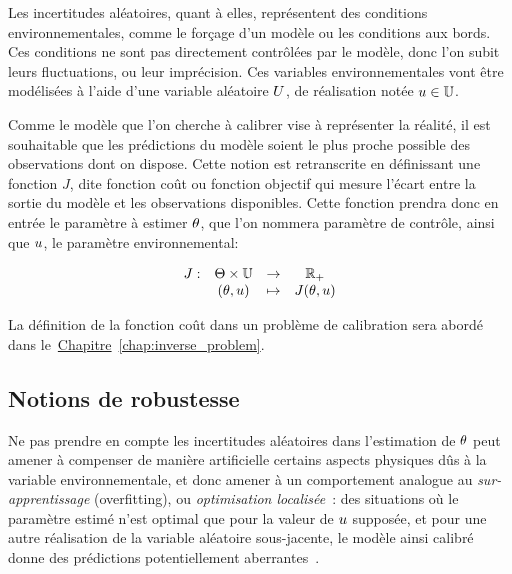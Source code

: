 \documentclass[../../Main_ManuscritThese.tex]{subfiles}
\newcommand{\frchap}[1]{\hyperref[#1]{Chapitre}~\ref{#1}}
\begin{document}
Les incertitudes aléatoires, quant à elles, représentent des
conditions environnementales, comme le forçage d'un modèle ou les
conditions aux bords. Ces conditions ne sont pas directement
contrôlées par le modèle, donc l'on subit leurs fluctuations, ou leur
imprécision. Ces variables environnementales vont être modélisées à
l'aide d'une variable aléatoire $U$, de réalisation notée
$u\in \mathbb{U}$.

Comme le modèle que l'on cherche à calibrer vise à représenter la
réalité, il est souhaitable que les prédictions du modèle soient le
plus proche possible des observations dont on dispose. Cette notion
est retranscrite en définissant une fonction $J$, dite fonction coût
ou fonction objectif qui mesure l'écart entre la sortie du modèle et
les observations disponibles. Cette fonction prendra donc en entrée le
paramètre à estimer $\theta$, que l'on nommera paramètre de contrôle,
ainsi que $u$, le paramètre environnemental:

\begin{equation*}
  \label{eq:def_J}
  \begin{array}{rccc}
   J: & \Theta\times\mathbb{U}& \rightarrow& \mathbb{R}_+ \\
   &(\theta,u)& \mapsto& J(\theta,u)
  \end{array}
\end{equation*}

La définition de la fonction coût dans un problème de calibration sera
abordé dans le~\frchap{chap:inverse_problem}.

\subsection*{Notions de robustesse}

Ne pas prendre en compte les incertitudes aléatoires dans l'estimation
de $\theta$ peut amener à compenser de manière artificielle certains
aspects physiques dûs à la variable environnementale, et donc amener à
un comportement analogue au \emph{sur-apprentissage} (overfitting), ou
\emph{optimisation localisée}~\cite{huyse_probabilistic_2002}: des
situations où le paramètre estimé n'est optimal que pour la valeur de
$u$ supposée, et pour une autre réalisation de la variable aléatoire
sous-jacente, le modèle ainsi calibré donne des prédictions
potentiellement aberrantes~\cite{kuczera_there_2010}.
\end{document}

